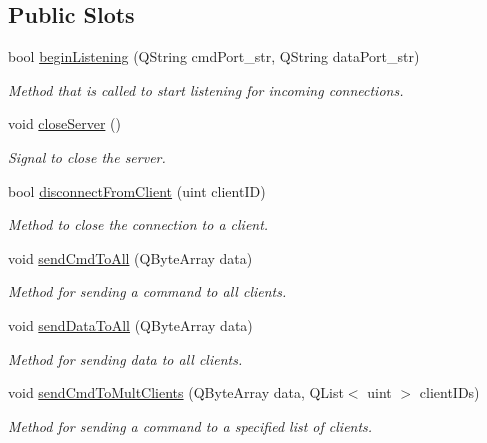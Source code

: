 \subsection*{Public Slots}
\begin{DoxyCompactItemize}
\item 
bool \hyperlink{class_network_1_1_server_socket_a9e41efd6e4e10a04f89ee75968516ffa}{begin\+Listening} (Q\+String cmd\+Port\+\_\+str, Q\+String data\+Port\+\_\+str)
\begin{DoxyCompactList}\small\item\em Method that is called to start listening for incoming connections. \end{DoxyCompactList}\item 
void \hyperlink{class_network_1_1_server_socket_a7a2145ba09e19b47acc31e1c52e3d302}{close\+Server} ()
\begin{DoxyCompactList}\small\item\em Signal to close the server. \end{DoxyCompactList}\item 
bool \hyperlink{class_network_1_1_server_socket_a4a81ff6969f81c35606d27aa47ca9dd5}{disconnect\+From\+Client} (uint client\+I\+D)
\begin{DoxyCompactList}\small\item\em Method to close the connection to a client. \end{DoxyCompactList}\item 
void \hyperlink{class_network_1_1_server_socket_a9a308f099e84a216bfcb4c4bf4a49882}{send\+Cmd\+To\+All} (Q\+Byte\+Array data)
\begin{DoxyCompactList}\small\item\em Method for sending a command to all clients. \end{DoxyCompactList}\item 
void \hyperlink{class_network_1_1_server_socket_a0d912607084ea9bc15626f3d88e5ac79}{send\+Data\+To\+All} (Q\+Byte\+Array data)
\begin{DoxyCompactList}\small\item\em Method for sending data to all clients. \end{DoxyCompactList}\item 
void \hyperlink{class_network_1_1_server_socket_a6ebb53346e5a8492c56d817e7f7390b8}{send\+Cmd\+To\+Mult\+Clients} (Q\+Byte\+Array data, Q\+List$<$ uint $>$ client\+I\+Ds)
\begin{DoxyCompactList}\small\item\em Method for sending a command to a specified list of clients. \end{DoxyCompactList}\item 

\end{DoxyCompactItemize}
